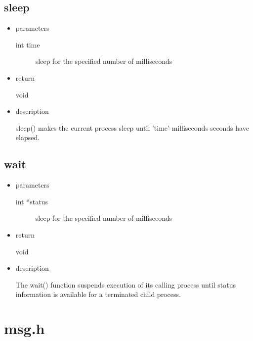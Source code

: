 \subsection{sleep}
\begin{itemize}
\item{parameters}
\begin{description}
	\item[int time] sleep for the specified number of milliseconds
\end{description}
\item{return}
\begin{description}
	\item[void]
\end{description}
\item{description}

sleep()  makes  the  current  process  sleep until 'time' milliseconds seconds have
elapsed.
\end{itemize}

\subsection{wait}
\begin{itemize}
\item{parameters}
\begin{description}
	\item[int *status] sleep for the specified number of milliseconds
\end{description}
\item{return}
\begin{description}
	\item[void]
\end{description}
\item{description}

The wait() function suspends execution of its calling process until
status information is available for a terminated child process.
\end{itemize}

\section{msg.h}

